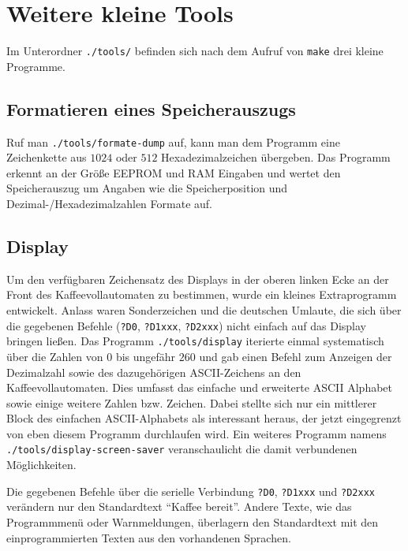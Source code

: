 \section{Weitere kleine Tools}\label{subsec:tools}
Im Unterordner \texttt{./tools/} befinden sich nach dem Aufruf von \texttt{make} drei kleine Programme.

\subsection{Formatieren eines Speicherauszugs}\label{subsec:formate-dump}
Ruf man \texttt{./tools/formate-dump} auf, kann man dem Programm eine Zeichenkette aus $1024$ oder $512$ Hexadezimalzeichen übergeben.
Das Programm erkennt an der Größe \ac{EEPROM} und \ac{RAM} Eingaben und wertet den Speicherauszug um Angaben wie die Speicherposition und Dezimal-/Hexadezimalzahlen Formate auf.

\subsection{Display}
Um den verfügbaren Zeichensatz des Displays in der oberen linken Ecke an der Front des Kaffeevollautomaten zu bestimmen, wurde ein kleines Extraprogramm entwickelt.
Anlass waren Sonderzeichen und die deutschen Umlaute, die sich über die gegebenen Befehle (\texttt{?D0}, \texttt{?D1xxx}, \texttt{?D2xxx}) nicht einfach auf das Display bringen ließen.
Das Programm \texttt{./tools/display} iterierte einmal systematisch über die Zahlen von $0$ bis ungefähr $260$ und gab einen Befehl zum Anzeigen der Dezimalzahl sowie des dazugehörigen \ac{ASCII}-Zeichens an den Kaffeevollautomaten.
Dies umfasst das einfache und erweiterte \ac{ASCII} Alphabet sowie einige weitere Zahlen bzw. Zeichen.
Dabei stellte sich nur ein mittlerer Block des einfachen \ac{ASCII}-Alphabets als interessant heraus, der jetzt eingegrenzt von eben diesem Programm durchlaufen wird.
Ein weiteres Programm namens \texttt{./tools/display-screen-saver} veranschaulicht die damit verbundenen Möglichkeiten.

Die gegebenen Befehle über die serielle Verbindung \texttt{?D0}, \texttt{?D1xxx} und \texttt{?D2xxx} verändern nur den Standardtext "`Kaffee bereit"'.
Andere Texte, wie das Programmmenü oder Warnmeldungen, überlagern den Standardtext mit den einprogrammierten Texten aus den vorhandenen Sprachen.

